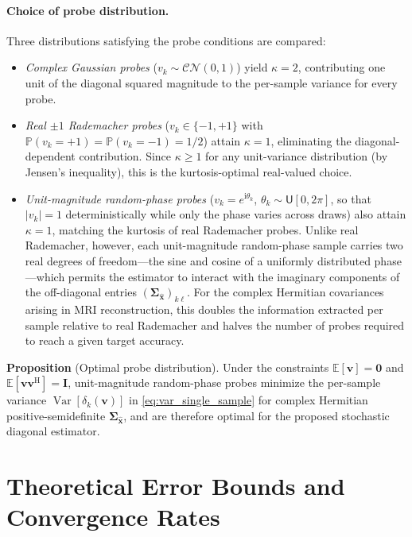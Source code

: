 \documentclass[AMA,STIX2COL,Linenumberson]{MRM}
\begin{document}
\paragraph{Choice of probe distribution.}
Three distributions satisfying the probe conditions are compared:
\begin{itemize}
\item \emph{Complex Gaussian probes}
  ($v_k \sim \mathcal{CN}(0,1)$)
  yield $\kappa = 2$, contributing one unit of the diagonal squared magnitude to the per-sample variance for every probe.
\item \emph{Real $\pm 1$ Rademacher probes}
  ($v_k \in \{-1,+1\}$ with $\mathbb{P}(v_k = +1) = \mathbb{P}(v_k = -1) = 1/2$) attain $\kappa = 1$, eliminating the diagonal-dependent contribution. Since $\kappa \ge 1$ for any unit-variance distribution (by Jensen's inequality), this is the kurtosis-optimal real-valued choice.
\item \emph{Unit-magnitude random-phase probes}
  ($v_k = e^{\mathrm{i}\theta_k}$,
  $\theta_k \sim \mathsf{U}[0,2\pi]$, so that $|v_k| = 1$ deterministically while only the phase varies across draws) also attain $\kappa = 1$, matching the kurtosis of real Rademacher probes. Unlike real Rademacher, however, each unit-magnitude random-phase sample carries two real degrees of freedom---the sine and cosine of a uniformly distributed phase---which permits the estimator to interact with the imaginary components of the off-diagonal entries $(\boldsymbol{\Sigma}_{\hat{\mathbf{x}}})_{k\ell}$. For the complex Hermitian covariances arising in MRI reconstruction, this doubles the information extracted per sample relative to real Rademacher and halves the number of probes required to reach a given target accuracy.
\end{itemize}

\noindent\textbf{Proposition} (Optimal probe distribution).
Under the constraints
$\mathbb{E}[\mathbf{v}] = \mathbf{0}$ and
$\mathbb{E}[\mathbf{v}\mathbf{v}^{\mathrm{H}}] = \mathbf{I}$,
unit-magnitude random-phase probes minimize the per-sample
variance $\operatorname{Var}[\delta_k(\mathbf{v})]$ in \eqref{eq:var_single_sample} for complex Hermitian positive-semidefinite $\boldsymbol{\Sigma}_{\hat{\mathbf{x}}}$, and are therefore
optimal for the proposed stochastic diagonal estimator.
 
 
\section{Theoretical Error Bounds and Convergence Rates}
\label{app:tail_bounds}
 
\end{document}
